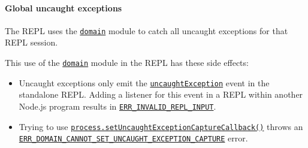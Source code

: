 \begin{Shaded}
\begin{Highlighting}[]
\end{Highlighting}
\end{Shaded}

\paragraph{Global uncaught exceptions}\label{global-uncaught-exceptions}

The REPL uses the \href{domain.md}{\texttt{domain}} module to catch all
uncaught exceptions for that REPL session.

This use of the \href{domain.md}{\texttt{domain}} module in the REPL has
these side effects:

\begin{itemize}
\item
  Uncaught exceptions only emit the
  \href{process.md\#event-uncaughtexception}{\texttt{\textquotesingle{}uncaughtException\textquotesingle{}}}
  event in the standalone REPL. Adding a listener for this event in a
  REPL within another Node.js program results in
  \href{errors.md\#err_invalid_repl_input}{\texttt{ERR\_INVALID\_REPL\_INPUT}}.

\begin{Shaded}
\begin{Highlighting}[]
\OperatorTok{=}\NormalTok{()}\OperatorTok{;}

\NormalTok{(}\StringTok{\textquotesingle{}}\NormalTok{)}\OperatorTok{;}

\NormalTok{()}\OperatorTok{;}
\end{Highlighting}
\end{Shaded}
\item
  Trying to use
  \href{process.md\#processsetuncaughtexceptioncapturecallbackfn}{\texttt{process.setUncaughtExceptionCaptureCallback()}}
  throws an
  \href{errors.md\#err_domain_cannot_set_uncaught_exception_capture}{\texttt{ERR\_DOMAIN\_CANNOT\_SET\_UNCAUGHT\_EXCEPTION\_CAPTURE}}
  error.
\end{itemize}

